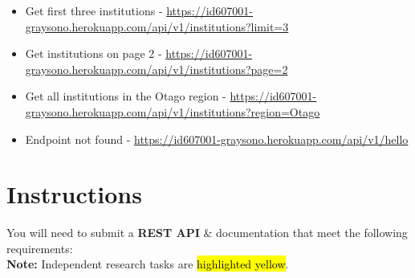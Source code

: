 \documentclass{article}
\begin{document}
\begin{itemize}
	\item Get first three institutions - \href{https://id607001-graysono.herokuapp.com/api/v1/institutions?limit=3}{https://id607001-graysono.herokuapp.com/api/v1/institutions?limit=3}
	\item Get institutions on page 2 - \href{https://id607001-graysono.herokuapp.com/api/v1/institutions?page=2}{https://id607001-graysono.herokuapp.com/api/v1/institutions?page=2}
	\item Get all institutions in the Otago region - \href{https://id607001-graysono.herokuapp.com/api/v1/institutions?region=Otago}{https://id607001-graysono.herokuapp.com/api/v1/institutions?region=Otago}
	\item Endpoint not found - \href{https://id607001-graysono.herokuapp.com/api/v1/hello}{https://id607001-graysono.herokuapp.com/api/v1/hello}
\end{itemize}

\section*{Instructions}
You will need to submit a \textbf{REST API} \& documentation that meet the following requirements: \\

\textbf{Note:} Independent research tasks are \hl{highlighted yellow}.
\end{document}
